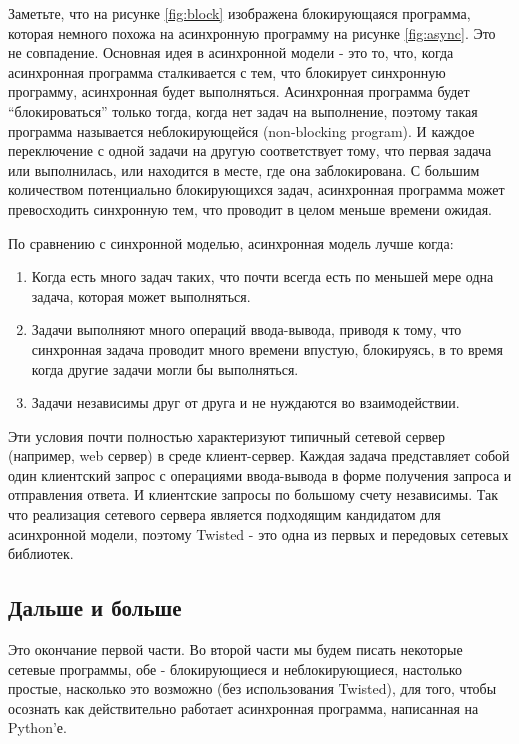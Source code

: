 Заметьте, что на рисунке \ref{fig:block} изображена блокирующаяся программа, 
которая немного похожа на асинхронную программу на рисунке \ref{fig:async}. 
Это не совпадение. Основная идея в асинхронной модели - это то, что, когда  
асинхронная программа сталкивается с тем, что блокирует синхронную 
программу, асинхронная будет выполняться. Асинхронная программа будет 
``блокироваться'' только тогда, когда нет задач на выполнение, поэтому 
такая программа называется неблокирующейся (non-blocking program). 
И каждое переключение с одной задачи на другую соответствует тому, что 
первая задача или выполнилась, или находится в месте, где она заблокирована. 
С большим количеством потенциально блокирующихся задач, 
асинхронная программа может превосходить синхронную тем, что проводит 
в целом меньше времени ожидая.


По сравнению с синхронной моделью, асинхронная модель лучше когда:

\begin{enumerate}

\item Когда есть много задач таких, что почти всегда есть по меньшей мере 
    одна задача, которая может выполняться.
\item Задачи выполняют много операций ввода-вывода, приводя к тому, что
    синхронная задача проводит много времени впустую, блокируясь, в то время 
    когда другие задачи могли бы выполняться.
\item Задачи независимы друг от друга и не нуждаются во 
    взаимодействии.
\end{enumerate}


Эти условия почти полностью характеризуют типичный сетевой сервер (например, 
web сервер) в среде клиент-сервер. Каждая задача представляет собой один 
клиентский запрос с операциями ввода-вывода в форме получения запроса и 
отправления ответа. И клиентские запросы по большому счету независимы. 
Так что реализация сетевого сервера является подходящим кандидатом для 
асинхронной модели, поэтому Twisted - это одна из первых и передовых 
сетевых библиотек. 


\subsection{Дальше и больше}


    Это окончание первой части. Во второй части мы будем писать 
некоторые сетевые программы, обе - блокирующиеся и неблокирующиеся, 
настолько простые, насколько это возможно (без использования Twisted), 
для того, чтобы осознать как действительно работает 
асинхронная программа, написанная на Python'е.


